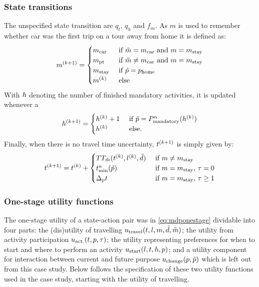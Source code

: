 \subsubsection{State transitions}
The unspecified state transition are $q_t$, $q_h$ and $f_m$. As $m$ is used to remember whether car was the first trip on a tour away from home it is defined as:
\begin{equation}
    m\ks{k+1} = 
    \begin{cases}
        \m{car} & \cif \act{m} = \m{car} \text{ and } m=m_\text{stay} \\
        \m{pt}  & \cif \act{m} \neq \m{car} \text{ and } m=m_\text{stay}  \\
        m_\text{stay} & \cif \act{p} = p_{\text{home}} \\
		m\ks{k} & \celse
    \end{cases}
\end{equation}
With $h$ denoting the number of finished mandatory activities, it is updated whenever a 
\begin{equation}
	\amem\ks{k+1} = 
	\begin{cases}
		\amem\ks{k}+1 &\cif \act{p} = P^n_{\text{mandatory}}(\amem\ks{k}) \\
		\amem\ks{k}& \celse.
	\end{cases}
\end{equation}
Finally, when there is no travel time uncertainty, $t^{(k+1)}$ is simply given by:
\begin{equation}
	t\ks{k+1} =t\ks{k} + \begin{cases}
  	\TT_{\act{m}}(t\ks{k},l\ks{k},\act{d}) & \cif m\neq m_\text{stay} \\
  	t_{\text{min}}^n(\act{p}) & \cif m= m_\text{stay} \text{, } \atime = 0  \\
  	\Delta_p t & \cif m= m_\text{stay} \text{, } \atime \geq 1 
	\end{cases}
\end{equation}

\subsubsection{One-stage utility functions}

The one-stage utility of a state-action pair was in \eqref{eq:mdponestage} dividable into four parts: the (dis)utility of travelling $u_\text{travel}(t,l,m,\tilde{d},\tilde{m})$; the utility from activity participation $u_\text{act.}(t,p,\tau)$; the utility representing preferences for when to start and where to perform an activity $u_\text{start}(l,t,h, p)$; and a utility component for interaction between current and future purpose $u_\text{change}(p,\tilde{p})$ which is left out from this case study. Below follows the specification of these two utility functions used in the case study, starting with the utility of travelling.

